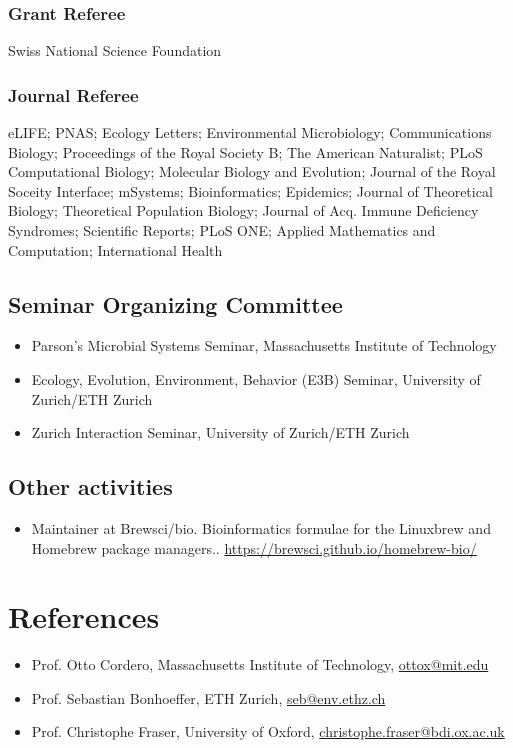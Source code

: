 \documentclass[11pt,letter]{article}
\begin{document}
\subsubsection*{Grant Referee}
Swiss National Science Foundation
    
\subsubsection*{Journal Referee}
eLIFE; PNAS; Ecology Letters; Environmental Microbiology; Communications Biology; Proceedings of the Royal Society B; The American Naturalist; PLoS Computational Biology; Molecular Biology and Evolution; Journal of the Royal Soceity Interface; mSystems; Bioinformatics; Epidemics; Journal of Theoretical Biology; Theoretical Population Biology; Journal of Acq. Immune Deficiency Syndromes; Scientific Reports; PLoS ONE; Applied Mathematics and Computation; International Health

\subsection*{Seminar Organizing Committee}
\begin{itemize}[label={},leftmargin=0pt]
  \item Parson's Microbial Systems Seminar, Massachusetts Institute of Technology
  \item Ecology, Evolution, Environment, Behavior (E3B) Seminar, University of Zurich/ETH Zurich
  \item Zurich Interaction Seminar, University of Zurich/ETH Zurich
\end{itemize}

\subsection*{Other activities}
\begin{itemize}[label={},leftmargin=0pt]
  \item%
    Maintainer at Brewsci/bio.
    Bioinformatics formulae for the Linuxbrew and Homebrew package managers..
    \url{https://brewsci.github.io/homebrew-bio/}
\end{itemize}

\section*{References}
\begin{itemize}[label={},leftmargin=0pt]
  \item%
    Prof. Otto Cordero, Massachusetts Institute of Technology, \href{mailto:ottox@mit.edu}{ottox@mit.edu}
  \item%
    Prof. Sebastian Bonhoeffer, ETH Zurich, \href{mailto:seb@env.ethz.ch}{seb@env.ethz.ch}
  \item%
    Prof. Christophe Fraser, University of Oxford, \href{mailto:christophe.fraser@bdi.ox.ac.uk}{christophe.fraser@bdi.ox.ac.uk}
\end{itemize}
\end{document}
